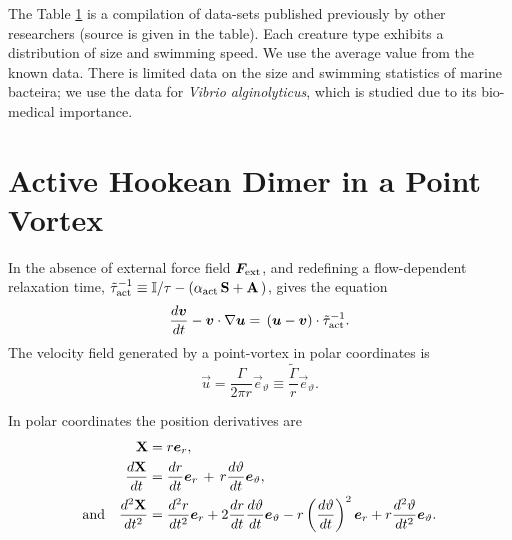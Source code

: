 \documentclass[../Rajarshi-thesis-draft.tex]{subfiles}
\begin{document}
The Table \ref{act-AOUPvortex} is a compilation of data-sets published previously by other researchers (source is given in the table). Each creature type exhibits a distribution of size and swimming speed. We use the average value from the known data. There is limited data on the size and swimming statistics of marine bacteira; we use the data for \textit{Vibrio alginolyticus}, which is studied due to its bio-medical importance. 

\section{Active Hookean Dimer in a Point Vortex}
\label{act-AOUPvortex}
In the absence of external force field $\vec{F}_{\rm ext}$, and redefining a flow-dependent relaxation time, $\tilde{\tau}_{\rm act}^{-1} \equiv \mathbb{I}/\tau - ( \alpha_{\rm act} \, \mathbf{S} + \mathbf{A} \,)$, gives the equation
\begin{equation}
\frac{d \vec{v}}{dt} - \vec{v}\cdot\nabla \vec{u} = \,(\vec{u} - \vec{v}) \cdot \tilde{\tau}_{\rm act}^{-1}.
\label{act-eqn:4}
\end{equation}
The velocity field generated by a point-vortex in polar coordinates is 
\begin{equation}
\vec{u} = \frac{\Gamma}{2\pi r} \vec{e}_\vartheta \equiv \frac{\tilde{\Gamma}}{r} \vec{e}_\vartheta.
\label{act-eqn:5}
\end{equation}

In polar coordinates the position derivatives are
\begin{align}
 \mathbf{X} & = r \vec{e}_r, \nonumber \\ 
\frac{d \mathbf{X}}{dt} & = \frac{dr}{dt} \vec{e}_r \, + \, r\frac{d\vartheta}{dt} \vec{e}_\vartheta, \label{act-eqn:6a}\\
{\rm and} \quad \frac{d^{2} \mathbf{X} }{dt^{2}} &= \frac{d^{2} r}{dt^{2}} \vec{e}_r + 2 \frac{d r}{dt}\frac{d \vartheta}{dt} \vec{e}_\vartheta - r \left(\frac{d \vartheta}{dt}\right)^{2} \vec{e}_r + r\frac{d^{2} \vartheta}{dt^{2}} \vec{e}_\vartheta. \label{act-eqn:7a}
\end{align}
\end{document}
